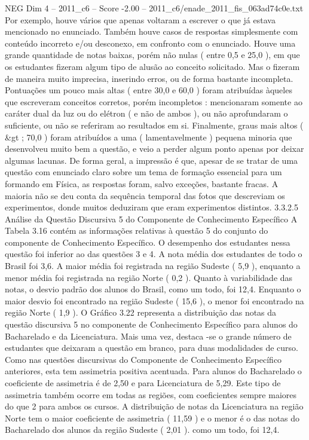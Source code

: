 \begin{textsample}{NEG Dim 4 – 2011\_c6 – Score -2.00 – 2011\_c6/enade\_2011\_fis\_063ad74c0e.txt}
Por exemplo, houve vários que apenas voltaram a escrever o que já estava mencionado no enunciado.
Também houve casos de respostas simplesmente com conteúdo incorreto e/ou desconexo, em confronto com o enunciado.
Houve uma grande quantidade de notas baixas, porém não nulas ( entre 0,5 e 25,0 ), em que os estudantes fizeram algum tipo de alusão ao conceito solicitado.
Mas o fizeram de maneira muito imprecisa, inserindo erros, ou de forma bastante incompleta.
Pontuações um pouco mais altas ( entre 30,0 e 60,0 ) foram atribuídas àqueles que escreveram conceitos corretos, porém incompletos : mencionaram somente ao caráter dual da luz ou do elétron ( e não de ambos ), ou não aprofundaram o suficiente, ou não se referiram ao resultados em si.
Finalmente, graus mais altos ( \&gt ; 70,0 ) foram atribuídos a uma ( lamentavelmente ) pequena minoria que desenvolveu muito bem a questão, e veio a perder algum ponto apenas por deixar algumas lacunas.
De forma geral, a impressão é que, apesar de se tratar de uma questão com enunciado claro sobre um tema de formação essencial para um formando em Física, as respostas foram, salvo exceções, bastante fracas.
A maioria não se deu conta da sequência temporal das fotos que descreviam os experimentos, donde muitos deduziram que eram experimentos distintos. 3.3.2.5 Análise da Questão Discursiva 5 do Componente de Conhecimento Específico A Tabela 3.16 contém as informações relativas à questão 5 do conjunto do componente de Conhecimento Específico.
O desempenho dos estudantes nessa questão foi inferior ao das questões 3 e 4.
A nota média dos estudantes de todo o Brasil foi 3,6.
A maior média foi registrada na região Sudeste ( 5,9 ), enquanto a menor média foi registrada na região Norte ( 0,2 ).
Quanto à variabilidade das notas, o desvio padrão dos alunos do Brasil, como um todo, foi 12,4.
Enquanto o maior desvio foi encontrado na região Sudeste ( 15,6 ), o menor foi encontrado na região Norte ( 1,9 ).
O Gráfico 3.22 representa a distribuição das notas da questão discursiva 5 no componente de Conhecimento Específico para alunos do Bacharelado e da Licenciatura.
Mais uma vez, destaca -se o grande número de estudantes que deixaram a questão em branco, para duas modalidades de curso.
Como nas questões discursivas do Componente de Conhecimento Específico anteriores, esta tem assimetria positiva acentuada.
Para alunos do Bacharelado o coeficiente de assimetria é de 2,50 e para Licenciatura de 5,29.
Este tipo de assimetria também ocorre em todas as regiões, com coeficientes sempre maiores do que 2 para ambos os cursos.
A distribuição de notas da Licenciatura na região Norte tem o maior coeficiente de assimetria ( 11,59 ) e o menor é o das notas do Bacharelado dos alunos da região Sudeste ( 2,01 ). como um todo, foi 12,4.

\end{textsample}
